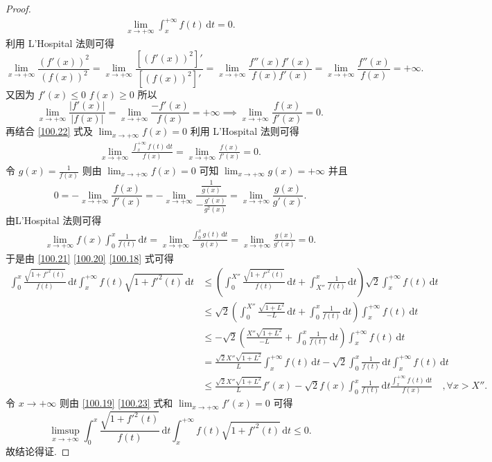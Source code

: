 \documentclass[../../main.tex]{subfiles}
\begin{document}
\begin{proof}
\begin{align}
\lim_{x \to +\infty} \int_x^{+\infty} f(t) \, \mathrm{d}t = 0 \label{100.22}.
\end{align}
利用 L’Hospital 法则可得
\[
\lim_{x \to +\infty} \frac{(f'(x))^2}{(f(x))^2} = \lim_{x \to +\infty} \frac{[(f'(x))^2]'}{[(f(x))^2]'} = \lim_{x \to +\infty} \frac{f''(x)f'(x)}{f(x)f'(x)} = \lim_{x \to +\infty} \frac{f''(x)}{f(x)} = +\infty.
\]
又因为 \( f'(x) \leqslant 0 \) \( f(x) \geqslant 0 \) 所以
\[
\lim_{x \to +\infty} \frac{|f'(x)|}{|f(x)|} = \lim_{x \to +\infty} \frac{-f'(x)}{f(x)} = +\infty \implies \lim_{x \to +\infty} \frac{f(x)}{f'(x)} = 0.
\]
再结合 \eqref{100.22} 式及 \( \lim_{x \to +\infty} f(x) = 0 \) 利用 L’Hospital 法则可得
\begin{align}
\lim_{x \to +\infty} \frac{\int_x^{+\infty} f(t) \, \mathrm{d}t}{f(x)} = \lim_{x \to +\infty} \frac{f(x)}{f'(x)} = 0 \label{100.23}.
\end{align}
令 \( g(x) = \frac{1}{f(x)} \) 则由 \( \lim_{x \to +\infty} f(x) = 0 \) 可知 \( \lim_{x \to +\infty} g(x) = +\infty \) 并且
\[
0 = -\lim_{x \to +\infty} \frac{f(x)}{f'(x)} = -\lim_{x \to +\infty} \frac{\frac{1}{g(x)}}{-\frac{g'(x)}{g^2(x)}} = \lim_{x \to +\infty} \frac{g(x)}{g'(x)}.
\]
由L’Hospital 法则可得
\begin{align}
\lim_{x \to +\infty} f(x) \int_0^x \frac{1}{f(t)} \, \mathrm{d}t = \lim_{x \to +\infty} \frac{\int_0^x g(t) \, \mathrm{d}t}{g(x)} = \lim_{x \to +\infty} \frac{g(x)}{g'(x)} = 0 \label{100.19}.
\end{align}
于是由 \eqref{100.21} \eqref{100.20} \eqref{100.18} 式可得
\begin{align*}
\int_0^x \frac{\sqrt{1 + f'^2(t)}}{f(t)} \, \mathrm{d}t \int_x^{+\infty} f(t)\sqrt{1 + f'^2(t)} \, \mathrm{d}t 
&\leqslant \left( \int_0^{X''} \frac{\sqrt{1 + f'^2(t)}}{f(t)} \, \mathrm{d}t + \int_{X''}^x \frac{1}{f(t)} \, \mathrm{d}t \right) \sqrt{2} \int_x^{+\infty} f(t) \, \mathrm{d}t \\
&\leqslant \sqrt{2} \left( \int_0^{X''} \frac{\sqrt{1 + L^2}}{-L} \, \mathrm{d}t + \int_0^x \frac{1}{f(t)} \, \mathrm{d}t \right) \int_x^{+\infty} f(t) \, \mathrm{d}t \\
&\leqslant -\sqrt{2} \left( \frac{X'' \sqrt{1 + L^2}}{-L} + \int_0^x \frac{1}{f(t)} \, \mathrm{d}t \right) \int_x^{+\infty} f(t) \, \mathrm{d}t \\
&= \frac{\sqrt{2} X'' \sqrt{1 + L^2}}{L} \int_x^{+\infty} f(t) \, \mathrm{d}t - \sqrt{2} \int_0^x \frac{1}{f(t)} \, \mathrm{d}t \int_x^{+\infty} f(t) \, \mathrm{d}t \\
&\leqslant \frac{\sqrt{2} X'' \sqrt{1 + L^2}}{L} f'(x) - \sqrt{2} f(x) \int_0^x \frac{1}{f(t)} \, \mathrm{d}t \frac{\int_x^{+\infty} f(t) \, \mathrm{d}t}{f(x)} \quad ,\forall x > X''.
\end{align*}
令 \( x \to +\infty \) 则由 \eqref{100.19} \eqref{100.23} 式和 \( \lim_{x \to +\infty} f'(x) = 0 \) 可得
\[
\limsup_{x \to +\infty} \int_0^x \frac{\sqrt{1 + f'^2(t)}}{f(t)} \, \mathrm{d}t \int_x^{+\infty} f(t)\sqrt{1 + f'^2(t)} \, \mathrm{d}t \leqslant 0.
\]
故结论得证.
\end{proof}
\end{document}
